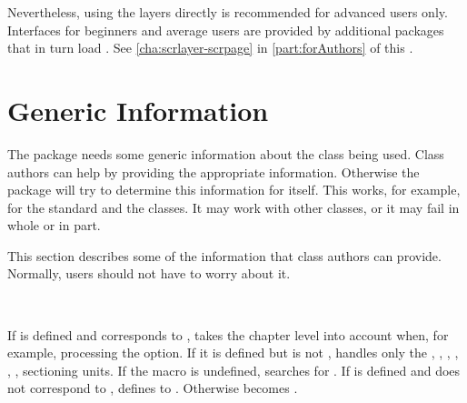 Nevertheless, using the layers directly is recommended for advanced users
only. Interfaces for beginners and average users are provided by additional
packages that in turn load . See
\autoref{cha:scrlayer-scrpage} in \autoref{part:forAuthors} of this
.



\section{Generic Information}

The package needs some generic information about the class being used. Class
authors can help  by providing the appropriate information.
Otherwise the package will try to determine this information for itself. This
works, for example, for the standard and the \KOMAScript{} classes. It may
work with other classes, or it may fail in whole or in part.

This section describes some of the information that class authors can provide.
Normally, users should not have to worry about it.

\begin{Declaration}
  \ \ \ %
  \ %
\end{Declaration}
If  is defined and corresponds to
,  takes the chapter level
into account when, for example, processing the
 option. If it is defined but is not
,  handles only the
, ,
, ,
, ,
 sectioning units. If the macro is undefined,
 searches for . If
 is defined and does not correspond to
,  defines  to
. Otherwise  becomes
.%
\EndIndexGroup


